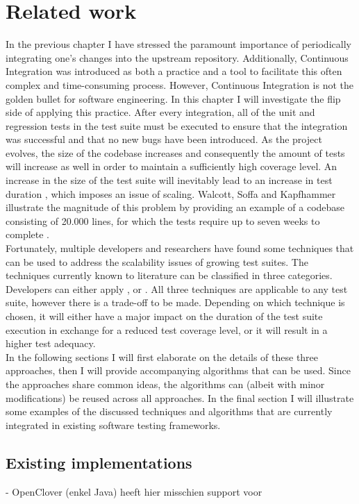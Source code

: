 
\chapter{Related work}
In the previous chapter I have stressed the paramount importance of periodically integrating one's changes into the upstream repository. Additionally, Continuous Integration was introduced as both a practice and a tool to facilitate this often complex and time-consuming process. However, Continuous Integration is not the golden bullet for software engineering. In this chapter I will investigate the flip side of applying this practice. After every integration, all of the unit and regression tests in the test suite must be executed to ensure that the integration was successful and that no new bugs have been introduced. As the project evolves, the size of the codebase increases and consequently the amount of tests will increase as well in order to maintain a sufficiently high coverage level. An increase in the size of the test suite will inevitably lead to an increase in test duration \cite{evaluationoftestsuiteminimization}, which imposes an issue of scaling. Walcott, Soffa and Kapfhammer illustrate the magnitude of this problem by providing an example of a codebase consisting of 20.000 lines, for which the tests require up to seven weeks to complete \cite{10.1145/1146238.1146240}.\\

\noindent Fortunately, multiple developers and researchers have found some techniques that can be used to address the scalability issues of growing test suites. The techniques currently known to literature can be classified in three categories. Developers can either apply \emph{\tsm{}}, \emph{\tcs{}} or \emph{\tcp{}} \cite{evaluationoftestsuiteminimization}. All three techniques are applicable to any test suite, however there is a trade-off to be made. Depending on which technique is chosen, it will either have a major impact on the duration of the test suite execution in exchange for a reduced test coverage level, or it will result in a higher test adequacy.\\

\noindent In the following sections I will first elaborate on the details of these three approaches, then I will provide accompanying algorithms that can be used. Since the approaches share common ideas, the algorithms can (albeit with minor modifications) be reused across all approaches. In the final section I will illustrate some examples of the discussed techniques and algorithms that are currently integrated in existing software testing frameworks.




\section{Existing implementations}
- OpenClover (enkel Java) heeft hier misschien support voor